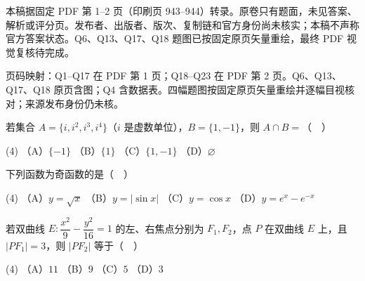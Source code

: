 

\begin{gktip}
本稿据固定 PDF 第 1–2 页（印刷页 943–944）转录。原卷只有题面，未见答案、解析或评分页。发布者、出版者、版次、复制链和官方身份尚未核实；本稿不声称官方答案状态。Q6、Q13、Q17、Q18 题图已按固定原页矢量重绘，最终 PDF 视觉复核待完成。

页码映射：Q1–Q17 在 PDF 第 1 页；Q18–Q23 在 PDF 第 2 页。Q6、Q13、Q17、Q18 原页含图；Q4 含数据表。四幅题图按固定原页矢量重绘并逐幅目视核对；来源发布身份仍未核。
\end{gktip}


\begin{question}
若集合 $A=\{i,i^2,i^3,i^4\}$（$i$ 是虚数单位），$B=\{1,-1\}$，则 $A\cap B=$（　）

\begin{gkopts}(4)
\task （A）$\{-1\}$
\task （B）$\{1\}$
\task （C）$\{1,-1\}$
\task （D）$\varnothing$
\end{gkopts}

\end{question}
\begin{question}
下列函数为奇函数的是（　）

\begin{gkopts}(4)
\task （A）$y=\sqrt{x}$
\task （B）$y=|\sin x|$
\task （C）$y=\cos x$
\task （D）$y=e^x-e^{-x}$
\end{gkopts}

\end{question}
\begin{question}
若双曲线 $E:\dfrac{x^2}{9}-\dfrac{y^2}{16}=1$ 的左、右焦点分别为 $F_1,F_2$，点 $P$ 在双曲线 $E$ 上，且 $|PF_1|=3$，则 $|PF_2|$ 等于（　）

\begin{gkopts}(4)
\task （A）$11$
\task （B）$9$
\task （C）$5$
\task （D）$3$
\end{gkopts}

\end{question}
